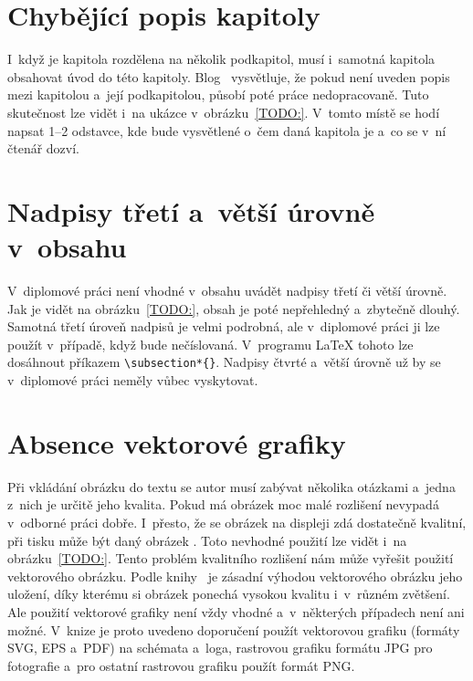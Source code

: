 \section{Chybějící popis kapitoly}

I~když je kapitola rozdělena na několik podkapitol, musí i~samotná kapitola
obsahovat úvod do této kapitoly. Blog~\cite{Leany_blog} vysvětluje, že pokud není uveden
popis mezi kapitolou a~její podkapitolou, působí poté práce nedopracovaně. Tuto
skutečnost lze vidět i~na ukázce v~obrázku~\ref{TODO:}. V~tomto místě
se hodí napsat 1--2 odstavce, kde bude vysvětlené o~čem daná kapitola je a~co se
v~ní čtenář dozví.


\section{Nadpisy třetí a~větší úrovně v~obsahu}
V~diplomové práci není vhodné v~obsahu uvádět nadpisy třetí či větší úrovně.
Jak je vidět na obrázku~\ref{TODO:}, obsah je poté nepřehledný a~zbytečně
dlouhý. Samotná třetí úroveň nadpisů je velmi podrobná, ale v~diplomové práci
ji lze použít v~případě, když bude nečíslovaná. V~programu {\LaTeX} tohoto lze dosáhnout
příkazem \verb|\subsection*{}|. Nadpisy čtvrté a~větší úrovně už by se v~diplomové
práci neměly vůbec vyskytovat.



\section{Absence vektorové grafiky} \label{vector_graphic}
Při vkládání obrázku do textu se autor musí zabývat několika otázkami a~jedna
z~nich je určitě jeho kvalita. Pokud má obrázek moc malé rozlišení
nevypadá v~odborné práci dobře. I~přesto, že se obrázek na displeji zdá
dostatečně kvalitní, při tisku může být daný obrázek .
Toto nevhodné použití lze vidět i~na obrázku~\ref{TODO:}.
Tento problém kvalitního rozlišení nám může vyřešit použití vektorového obrázku.
Podle knihy~\cite{Pruvodce_tvorbou_dokumentu} je zásadní výhodou vektorového
obrázku jeho uložení, díky kterému si obrázek ponechá vysokou kvalitu i~v~různém
zvětšení. Ale použití vektorové grafiky není vždy vhodné a~v~některých případech
není ani možné. V~knize je proto uvedeno doporučení použít vektorovou grafiku
(formáty SVG, EPS a~PDF) na schémata a~loga, rastrovou grafiku formátu JPG pro
fotografie a~pro ostatní rastrovou grafiku použít formát PNG.

